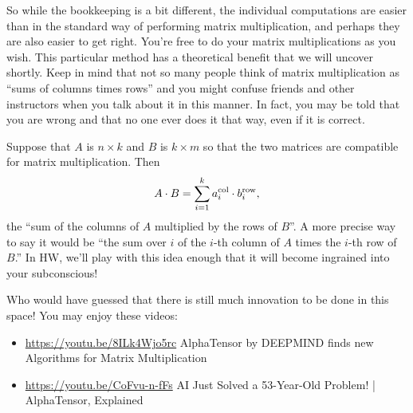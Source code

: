  
 


So while the bookkeeping is a bit different, the individual computations are easier than in the standard way of performing matrix multiplication, and perhaps they are also easier to get right. You're free to do your matrix multiplications as you wish. This particular method has a theoretical benefit that we will uncover shortly. Keep in mind that not so many people think of matrix multiplication as ``sums of columns times rows'' and you might confuse friends and other instructors when you talk about it in this manner. In fact, you may be told that you are wrong and that no one ever does it that way, even if it is correct. \\


\begin{tcolorbox}[sharp corners, colback=green!30, colframe=green!80!blue, title=\textbf{\large General Case of Matrix Multiplication using Columns of $\mathbf{A}$ and Rows of $\mathbf{B}$}]
 Suppose that $A$ is $n \times k$ and $B$ is $k \times m$ so that the two matrices are compatible for matrix multiplication. Then 
$$A\cdot B = \sum_{i=1}^{k} a_i^{\rm col} \cdot b_i^{\rm row},  $$
the ``sum of the columns of $A$ multiplied by the rows of $B$''. A more precise way to say it would be ``the sum over $i$ of the $i$-th column of $A$ times the $i$-th row of $B$.'' In HW, we'll play with this idea enough that it will become ingrained into your subconscious!
\end{tcolorbox}

\vspace*{.2cm}

\begin{tcolorbox}[title=\textbf{\large Alpha Go Takes on Matrix Multiplication}]
 Who would have guessed that there is still much innovation to be done in this space! You may enjoy these videos:

 \begin{itemize}
     \item \url{https://youtu.be/8ILk4Wjo5rc} AlphaTensor by DEEPMIND finds new Algorithms for Matrix Multiplication

     \item \url{https://youtu.be/CoFvu-n-fFs} AI Just Solved a 53-Year-Old Problem! | AlphaTensor, Explained
 \end{itemize}
\end{tcolorbox}


